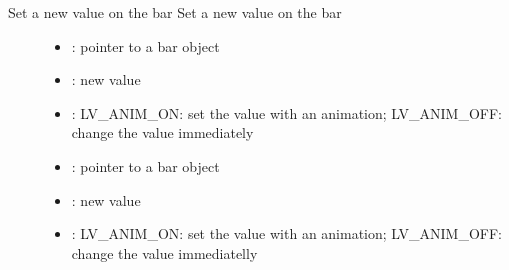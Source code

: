 \documentclass[letterpaper,10pt,english]{sphinxmanual}
\begin{document}
\begin{fulllineitems}
\label{\detokenize{object-types/bar:_CPPv416lv_bar_set_valueP8lv_obj_t7int16_t16lv_anim_enable_t}}%
\pysigstartmultiline
{}\label{\detokenize{object-types/bar:lv__bar_8h_1afbc4c3481727e56cee7f9c66cf89f7b4}}%
\pysigstopmultiline
Set a new value on the bar 
Set a new value on the bar 
\begin{description}
\item[{}] \leavevmode\begin{itemize}
\item {} 
: pointer to a bar object 

\item {} 
: new value 

\item {} 
: LV\_ANIM\_ON: set the value with an animation; LV\_ANIM\_OFF: change the value immediately

\end{itemize}

\item[{}] \leavevmode\begin{itemize}
\item {} 
: pointer to a bar object 

\item {} 
: new value 

\item {} 
: LV\_ANIM\_ON: set the value with an animation; LV\_ANIM\_OFF: change the value immediatelly 

\end{itemize}

\end{description}


\end{fulllineitems}

\end{document}
